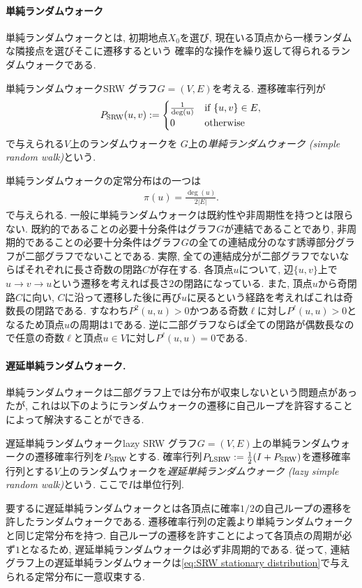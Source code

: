 \paragraph*{単純ランダムウォーク}
単純ランダムウォークとは, 初期地点$X_0$を選び, 現在いる頂点から一様ランダムな隣接点を選びそこに遷移するという
確率的な操作を繰り返して得られるランダムウォークである.
%
\begin{definition}{単純ランダムウォーク}{SRW}
  グラフ$G=(V,E)$を考える.
  遷移確率行列が
  \[
    P_{\mathrm{SRW}}(u,v) \mathrel{:=} \begin{cases}
      \frac{1}{\deg(u)} & \text{if }\{u,v\}\in E, \\
      0                 & \text{otherwise}
    \end{cases}
  \]
  で与えられる$V$上のランダムウォークを
  $G$上の\emph{単純ランダムウォーク (simple random walk)}という.
\end{definition}
%

単純ランダムウォークの定常分布はの一つは
\begin{align}
  \pi(u) = \frac{\deg(u)}{2|E|}. \label{eq:SRW stationary distribution}
\end{align}
で与えられる.
一般に単純ランダムウォークは既約性や非周期性を持つとは限らない.
既約的であることの必要十分条件はグラフ$G$が連結であることであり,
非周期的であることの必要十分条件はグラフ$G$の全ての連結成分のなす誘導部分グラフが二部グラフでないことである.
実際, 全ての連結成分が二部グラフでないならばそれぞれに長さ奇数の閉路$C$が存在する.
各頂点$u$について, 辺$\{u,v\}$上で$u\to v \to u$という遷移を考えれば長さ$2$の閉路になっている.
また, 頂点$u$から奇閉路$C$に向い, $C$に沿って遷移した後に再び$u$に戻るという経路を考えればこれは奇数長の閉路である.
すなわち$P^2(u,u)>0$かつある奇数$\ell$に対し$P^{\ell}(u,u)>0$となるため頂点$u$の周期は$1$である.
逆に二部グラフならば全ての閉路が偶数長なので任意の奇数$\ell$と頂点$u\in V$に対し$P^\ell(u,u)=0$である.

\paragraph*{遅延単純ランダムウォーク.}
単純ランダムウォークは二部グラフ上では分布が収束しないという問題点があったが,
これは以下のようにランダムウォークの遷移に自己ループを許容することによって解決することができる.
%
\begin{definition}{遅延単純ランダムウォーク}{lazy SRW}
  グラフ$G=(V,E)$上の単純ランダムウォークの遷移確率行列を$P_{\mathrm{SRW}}$とする.
  確率行列$P_{\mathrm{LSRW}} \mathrel{:=} \frac{1}{2}(I+P_{\mathrm{SRW}})$を遷移確率行列とする$V$上のランダムウォークを\emph{遅延単純ランダムウォーク (lazy simple random walk)}という. ここで$I$は単位行列.
\end{definition}
要するに遅延単純ランダムウォークとは各頂点に確率$1/2$の自己ループの遷移を許したランダムウォークである.
遷移確率行列の定義より単純ランダムウォークと同じ定常分布を持つ.
自己ループの遷移を許すことによって各頂点の周期が必ず$1$となるため, 遅延単純ランダムウォークは必ず非周期的である.
従って, 連結グラフ上の遅延単純ランダムウォークは\cref{eq:SRW stationary distribution}で与えられる定常分布に一意収束する.

